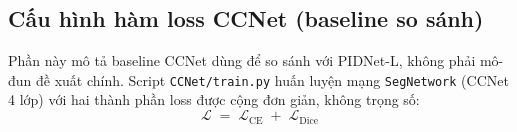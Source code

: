  
 
\subsection{Cấu hình hàm loss CCNet (baseline so sánh)}
\label{sec:loss_ccnet}

Phần này mô tả baseline CCNet dùng để so sánh với PIDNet-L, không phải mô-đun đề xuất chính. Script \texttt{CCNet/train.py} huấn luyện mạng \texttt{SegNetwork} (CCNet 4 lớp) với hai thành phần loss được cộng đơn giản, không trọng số:
\begin{equation}
  \mathcal{L} \;=\; \mathcal{L}_{\mathrm{CE}} \;+\; \mathcal{L}_{\mathrm{Dice}}
  \label{eq:ccnet_loss}
\end{equation}

